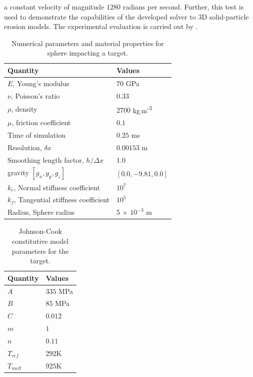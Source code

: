 a constant velocity of magnitude $1280$ radians per second. Further, this test is used to
demonstrate the capabilities of the developed solver to 3D solid-particle
erosion models. The experimental evaluation is carried out by
\cite{zang2022investigation}.
\begin{table}[!ht]
  \centering
  \caption{Numerical parameters and material properties for sphere impacting a target.}%
  \label{tab:sphere-target-impact}
  \begin{tabular}[!ht]{ll}
    \toprule
    Quantity & Values\\
    \midrule
    $E$, Young's modulus & $70$ GPa \\
    $\nu$, Poisson's ratio & $0.33$ \\
    $\rho$, density & $2700$ kg\,m\textsuperscript{-3} \\
    $\mu$, friction coefficient & $0.1$ \\
    Time of simulation & $0.25$ ms \\
    Resolution, $\delta x$ & $0.00153$ m\\
    Smoothing length factor, $h/\Delta x$ & 1.0\\
    gravity $[g_x, g_y, g_z]$ & $[0.0, -9.81, 0.0]$\\
    $k_r$, Normal stiffness coefficient & $10^{7}$ \\
    $k_f$, Tangential stiffness coefficient & $10^{5}$ \\
    $\text{Radius}$, Sphere radius & 5 $\times$ $10^{-3}$ m\\
    \bottomrule
  \end{tabular}
\end{table}
\begin{table}[!ht]
  \centering
  \begin{tabular}[!ht]{ll}
    \toprule
    Quantity & Values\\
    \midrule
    $A$ & $335$ MPa \\
    $B$ & $85$ MPa \\
    $C$ & $0.012$ \\
    $m$ & $1$ \\
    $n$ & $0.11$ \\
    $T_{ref}$ & $292$K \\
    $T_{melt}$ & $925$K \\
    \bottomrule
  \end{tabular}
  \caption{Johnson-Cook constitutive model parameters for the target.}%
  \label{tab:sphere-target-impact-Johnson}
\end{table}

